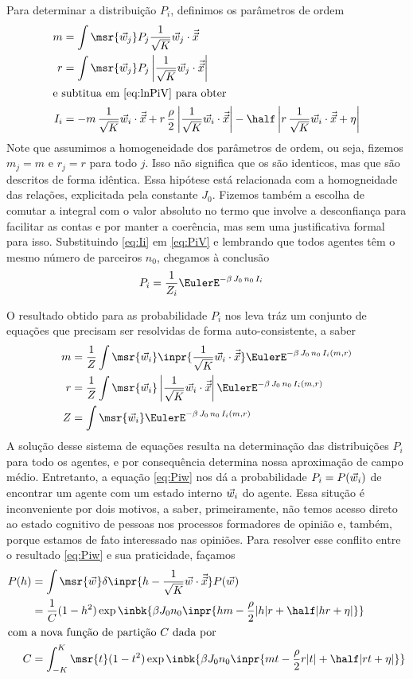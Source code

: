Para determinar a distribuição $P_i$, definimos os parâmetros de ordem
\begin{align}
  m & = \int \msr{\agt{j}} P_j \opn{j}{\qst} \label{eq:m-def} \\
  r & = \int \msr{\agt{j}} P_j \left|\opn{j}{\qst}\right| \label{eq:r-def}\\
\intertext{e subtitua em \eqref{eq:lnPiV} para obter}
  I_i & = -m\,\opn{i}{\qst} 
          +r\,\frac{\rho}{2}\left|\opn{i}{\qst}\right| 
          - \half\left|r\,\opn{i}{\qst} + \cutoff\right| \label{eq:Ii}
\end{align}
Note que assumimos a homogeneidade dos parâmetros de ordem, ou seja,
fizemos $m_j = m$ e $r_j = r$ para todo $j$. Isso não significa que os
são identicos, mas que são descritos de forma idêntica. Essa hipótese
está relacionada com a homogneidade das relações, explicitada pela
constante $J_0$. Fizemos também a escolha de comutar a integral com o
valor absoluto no termo que involve a desconfiança para facilitar as
contas e por manter a coerência, mas sem uma justificativa formal para
isso. Substituindo \eqref{eq:Ii} em \eqref{eq:PiV} e lembrando que
todos agentes têm o mesmo número de parceiros $n_0$, chegamos à
conclusão
\begin{align}
  P_i & = \frac{1}{Z_i}\EulerE^{-\beta\,J_0\,n_0\,I_i} \label{eq:Piw}
\end{align}

O resultado obtido para as probabilidade $P_i$ nos leva tráz um
conjunto de equações que precisam ser resolvidas de forma
auto-consistente, a saber
\begin{align}
  m & = \frac{1}{Z} \int \msr{\agt{i}} \inpr{\opn{i}{\qst}}\EulerE^{-\beta\,J_0\,n_0\,I_i(m,r)} \label{eq:sc-m}\\
  r & = \frac{1}{Z} \int \msr{\agt{i}} \left|\opn{i}{\qst}\right|\EulerE^{-\beta\,J_0\,n_0\,I_i(m,r)} \label{eq:sc-r}\\
  Z & = \int \msr{\agt{i}}\EulerE^{-\beta\,J_0\,n_0\,I_i(m,r)} \label{eq:sc-Z}
\end{align}
A solução desse sistema de equações resulta na determinação das
distribuições $P_i$ para todo os agentes, e por consequência determina
nossa aproximação de campo médio. Entretanto, a equação \eqref{eq:Piw}
nos dá a probabilidade $P_i = P(\vec{w}_{i})$ de encontrar um agente com
um estado interno $\vec{w}_{i}$ do agente. Essa situção é inconveniente
por dois motivos, a saber, primeiramente, não temos acesso direto ao
estado cognitivo de pessoas nos processos formadores de opinião e,
também, porque estamos de fato interessado nas opiniões. Para resolver
esse conflito entre o resultado \eqref{eq:Piw} e sua praticidade, façamos
\begin{align}
  P(h) & = \int \msr{\agt{ }} \delta\inpr{h - \opn{ }{\qst}} P(\agt{ }) \notag \\
       & = \frac{1}{C}(1 - h^2) \exp \inbk{\beta J_0 n_0 \inpr {
          hm - \frac{\rho}{2}|h|r + \half|hr + \cutoff|}} \label{eq:Ph}\\
\intertext{com a nova função de partição $C$ dada por}
  C & = \int _{-K}^K \msr{t} (1 - t^2) \exp \inbk{\beta J_0 n_0\inpr{
        mt - \frac{\rho}{2}r|t| + \half|rt + \cutoff|}} \label{eq:Zh}
\end{align}

